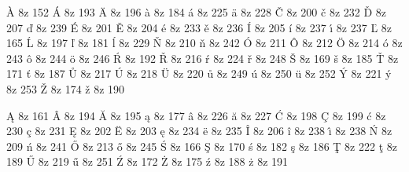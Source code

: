 
\accentdef  \` A      8z  152
\accentdef  \' A      8z  193
\accentdef  \" A      8z  196
\accentdef  \` a      8z  184
\accentdef  \' a      8z  225
\accentdef  \" a      8z  228
\accentdef  \v C      8z  200
\accentdef  \v c      8z  232
\accentdef  \v D      8z  207
\accentdef  \v d      8z  239
\accentdef  \' E      8z  201
\accentdef  \v E      8z  204
\accentdef  \' e      8z  233
\accentdef  \v e      8z  236
\accentdef  \' I      8z  205
\accentdef  \' i      8z  237
\accentdef  \' {\i}   8z  237
\accentdef  \v L      8z  165
\accentdef  \' L      8z  197
\accentdef  \v l      8z  181
\accentdef  \' l      8z  229
\accentdef  \v N      8z  210
\accentdef  \v n      8z  242
\accentdef  \' O      8z  211
\accentdef  \^ O      8z  212
\accentdef  \" O      8z  214
\accentdef  \' o      8z  243
\accentdef  \^ o      8z  244
\accentdef  \" o      8z  246
\accentdef  \' R      8z  192
\accentdef  \v R      8z  216
\accentdef  \' r      8z  224
\accentdef  \v r      8z  248
\accentdef  \v S      8z  169
\accentdef  \v s      8z  185
\accentdef  \v T      8z  171
\accentdef  \v t      8z  187
\accentdef  \r U      8z  217
\accentdef  \' U      8z  218
\accentdef  \" U      8z  220
\accentdef  \r u      8z  249
\accentdef  \' u      8z  250
\accentdef  \" u      8z  252
\accentdef  \' Y      8z  221
\accentdef  \' y      8z  253
\accentdef  \v Z      8z  174
\accentdef  \v z      8z  190


\accentdef  \k A      8z  161
\accentdef  \^ A      8z  194
\accentdef  \u A      8z  195
\accentdef  \k a      8z  177
\accentdef  \^ a      8z  226
\accentdef  \u a      8z  227
\accentdef  \' C      8z  198
\accentdef  \c C      8z  199
\accentdef  \' c      8z  230
\accentdef  \c c      8z  231
\accentdef  \k E      8z  202
\accentdef  \" E      8z  203
\accentdef  \k e      8z  234
\accentdef  \" e      8z  235
\accentdef  \^ I      8z  206
\accentdef  \^ i      8z  238
\accentdef  \^ {\i}   8z  238
\accentdef  \' N      8z  209
\accentdef  \' n      8z  241
\accentdef  \H O      8z  213
\accentdef  \H o      8z  245
\accentdef  \' S      8z  166
\accentdef  \c S      8z  170
\accentdef  \' s      8z  182
\accentdef  \c s      8z  186
\accentdef  \c T      8z  222
\accentdef  \c t      8z  189
\accentdef  \H U      8z  219
\accentdef  \H u      8z  251
\accentdef  \' Z      8z  172
\accentdef  \. Z      8z  175
\accentdef  \' z      8z  188
\accentdef  \. z      8z  191


